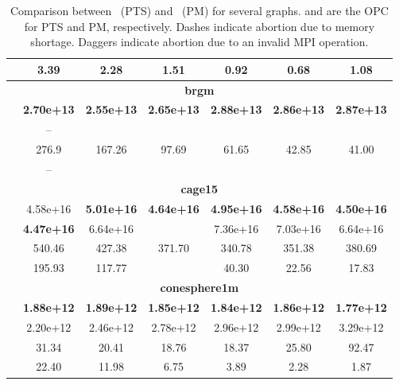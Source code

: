 \documentclass[fleqn,12pt,twoside]{article}
\begin{document}
\begin{table}[hbt]
\begin{center}
\begin{tabular}{|l||c|c|c|c|c|c|}
      & 3.39     & 2.28	    & 1.51     & 0.92     & 0.68     & 1.08     \\
    \hline
    \multicolumn{7}{|c|}{{\bf brgm}} \\
    \hline
     & \textbf{2.70e+13} & \textbf{2.55e+13} & \textbf{2.65e+13} & \textbf{2.88e+13} & \textbf{2.86e+13} & \textbf{2.87e+13} \\
      & -- &  &  &  &  &  \\
     & 276.9 & 167.26 & 97.69 & 61.65 & 42.85 & 41.00 \\
      & -- &  &  &  &  &  \\
    \hline
    \multicolumn{7}{|c|}{{\bf cage15}} \\
    \hline
     & 4.58e+16 & \textbf{5.01e+16} & \textbf{4.64e+16} & \textbf{4.95e+16} & \textbf{4.58e+16} & \textbf{4.50e+16} \\
      & \textbf{4.47e+16} & 6.64e+16 &  & 7.36e+16 & 7.03e+16 & 6.64e+16\\
     & 540.46 & 427.38 & 371.70 & 340.78 & 351.38 & 380.69 \\
      & 195.93 & 117.77 &  & 40.30 & 22.56 & 17.83 \\
    \hline
    \multicolumn{7}{|c|}{{\bf conesphere1m}} \\
    \hline
     & \textbf{1.88e+12} & \textbf{1.89e+12} & \textbf{1.85e+12} & \textbf{1.84e+12} & \textbf{1.86e+12} & \textbf{1.77e+12} \\
      & 2.20e+12 & 2.46e+12 & 2.78e+12 & 2.96e+12 & 2.99e+12 & 3.29e+12 \\
     & 31.34    & 20.41    & 18.76    & 18.37    & 25.80    & 92.47    \\
      & 22.40    & 11.98    & 6.75     & 3.89     & 2.28     & 1.87     \\
    \hline
  \end{tabular}
\end{center}
\caption{Comparison between \ptscotch\ (PTS) and \parmetis\ (PM) for
  several graphs.  and  are the OPC for PTS and PM,
  respectively. Dashes indicate abortion due to memory shortage.
  Daggers indicate abortion due to an invalid MPI operation.}
\label{tabparmetis}
\end{table}
 
\end{document}
